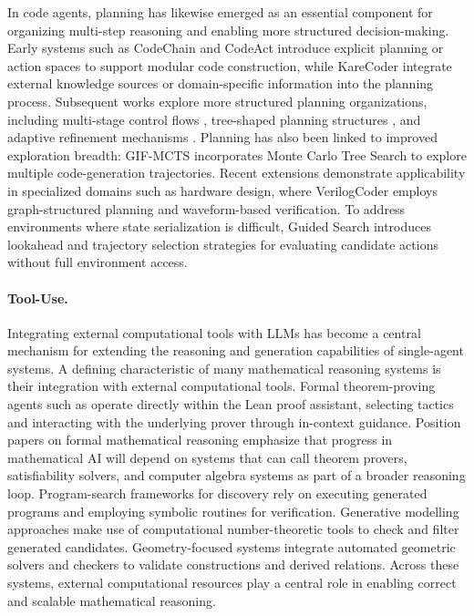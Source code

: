 In code agents, planning has likewise emerged as an essential component for organizing 
multi-step reasoning and enabling more structured decision-making. Early systems such as 
CodeChain \citep{le2023codechain} and CodeAct \citep{wang2024executable} introduce explicit planning 
or action spaces to support modular code construction, while KareCoder \citep{huang2024knowledge} 
integrate external knowledge sources or domain-specific information 
into the planning process. Subsequent works explore more structured planning organizations, including 
multi-stage control flows \citep{bairi2024codeplan,multi-stage}, tree-shaped planning structures 
\citep{li2024codetree,ni2024tree}, and adaptive refinement mechanisms \citep{aggarwal2025dars}. 
Planning has also been linked to improved exploration breadth: GIF-MCTS \citep{dainese2024generating} 
incorporates Monte Carlo Tree Search to explore multiple code-generation trajectories.
Recent extensions demonstrate applicability in specialized domains such as hardware design, 
where VerilogCoder \citep{ho2025verilogcoder} employs graph-structured planning and waveform-based 
verification. To address environments where state serialization is difficult, Guided Search 
\citep{zainullina2025guidedsearchstrategiesnonserializable} introduces lookahead and trajectory 
selection strategies for evaluating candidate actions without full environment access.





\paragraph{Tool-Use.}
Integrating external computational tools with LLMs has become a central mechanism for extending the reasoning and generation capabilities of single-agent systems. A defining characteristic of many mathematical reasoning systems is their integration with external computational tools. Formal theorem-proving agents such as \citet{thakur2024context} operate directly within the Lean proof assistant, selecting tactics and interacting with the underlying prover through in-context guidance. Position papers on formal mathematical reasoning \citep{yang2024formal} emphasize that progress in mathematical AI will depend on systems that can call theorem provers, satisfiability solvers, and computer algebra systems as part of a broader reasoning loop. Program-search frameworks for discovery \citep{romera2024mathematical} rely on executing generated programs and employing symbolic routines for verification. Generative modelling approaches \citep{ellenberg2025generative} make use of computational number-theoretic tools to check and filter generated candidates. Geometry-focused systems \citep{trinh2024solving,hubert2024ai} integrate automated geometric solvers and checkers to validate constructions and derived relations. Across these systems, external computational resources play a central role in enabling correct and scalable mathematical reasoning.

